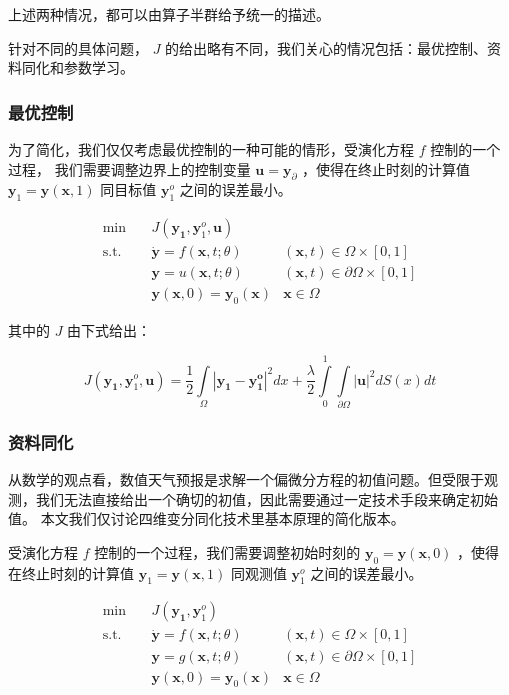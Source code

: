\documentclass[a4paper,12pt]{article}
\begin{document}
上述两种情况，都可以由算子半群给予统一的描述。

针对不同的具体问题， $ J $ 的给出略有不同，我们关心的情况包括：最优控制、资料同化和参数学习。

\subsubsection{最优控制}

为了简化，我们仅仅考虑最优控制的一种可能的情形，受演化方程 $ f $ 控制的一个过程，
我们需要调整边界上的控制变量 $ \mathbf{u} = \mathbf{y}_{\partial} $ ，使得在终止时刻的计算值 $ \mathbf{y}_1 = \mathbf{y}(\mathbf{x}, 1)$ 同目标值 $ \mathbf{y}_1^o $ 之间的误差最小。

$$
\begin{array}{rcll}
\min &~& J(\mathbf{y_1}, \mathbf{y}_1^o, \mathbf{u}) & \\
\mathrm{s.t.} &~& \dot{\mathbf{y}} = f(\mathbf{x}, t; \theta) & (\mathbf{x}, t) \in \Omega \times [0, 1] \\
&~& \mathbf{y} = u(\mathbf{x}, t; \theta) & (\mathbf{x}, t) \in \partial \Omega \times [0, 1] \\
&~& \mathbf{y}(\mathbf{x}, 0) = \mathbf{y}_0(\mathbf{x}) & \mathbf{x} \in \Omega
\end{array}
$$

其中的 $ J $ 由下式给出：

$$
J(\mathbf{y_1}, \mathbf{y}_1^o, \mathbf{u}) = \frac{1}{2} \int\limits_{\Omega}|\mathbf{y_1} - \mathbf{y_1^o}|^2dx +  \frac{\lambda}{2} \int\limits_{0}^{1}\int\limits_{\partial \Omega} |\mathbf{u}|^2 dS(x) dt
$$


\subsubsection{资料同化}

从数学的观点看，数值天气预报是求解一个偏微分方程的初值问题。但受限于观测，我们无法直接给出一个确切的初值，因此需要通过一定技术手段来确定初始值。
本文我们仅讨论四维变分同化技术里基本原理的简化版本。

受演化方程 $ f $ 控制的一个过程，我们需要调整初始时刻的 $ \mathbf{y}_0 = \mathbf{y}(\mathbf{x}, 0) $ ，使得在终止时刻的计算值 $ \mathbf{y}_1 = \mathbf{y}(\mathbf{x}, 1) $ 同观测值 $ \mathbf{y}_1^o $ 之间的误差最小。

$$
\begin{array}{rcll}
\min &~& J(\mathbf{y_1}, \mathbf{y}_1^o) & \\
\mathrm{s.t.} &~& \dot{\mathbf{y}} = f(\mathbf{x}, t; \theta) & (\mathbf{x}, t) \in \Omega \times [0, 1] \\
&~& \mathbf{y} = g(\mathbf{x}, t; \theta) & (\mathbf{x}, t) \in \partial \Omega \times [0, 1] \\
&~& \mathbf{y}(\mathbf{x}, 0) = \mathbf{y}_0(\mathbf{x}) & \mathbf{x} \in \Omega
\end{array}
$$
\end{document}
